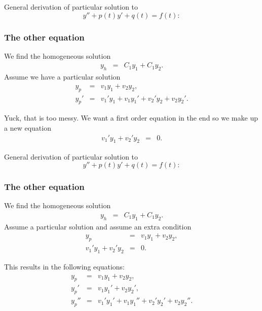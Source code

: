 \begin{frame}
General derivation of particular solution to $$y''+p(t)y'+q(t)=f(t):$$  
  \frametitle{The other equation}

  We find the homogeneous solution 
  \begin{eqnarray*}
    y_h & = & C_1  y_1 + C_1 y_2. 
  \end{eqnarray*}
  Assume we have a particular solution
  \begin{eqnarray*}
    y_p & = & v_1 y_1 + v_2 y_2, \\
    y_p' & = & v_1' y_1 + v_1 y_1' + v_2' y_2 + v_2 y_2'. 
  \end{eqnarray*}

  Yuck, that is too messy. We want a first order equation in the end
  so {\color{red}we make up a new equation
  \begin{eqnarray}
    \label{eqn:firstConstraint}
    v_1' y_1 + v_2' y_2 & = & 0.
  \end{eqnarray}}

\end{frame}


\begin{frame}
General derivation of particular solution to $$y''+p(t)y'+q(t)=f(t):$$  
  \frametitle{The other equation}

  We find the homogeneous solution 
  \begin{eqnarray*}
    y_h & = & C_1  y_1 + C_1 y_2. 
  \end{eqnarray*}
  Assume  a particular solution and assume an extra condition
  \begin{eqnarray*}
    y_p & = & v_1 y_1 + v_2 y_2, \\
    v_1' y_1 + v_2' y_2 & = & 0.
  \end{eqnarray*}


  This results in the following equations:
  \begin{eqnarray*}
    y_p   & = & v_1 y_1 + v_2 y_2, \\
    y_p'  & = & v_1 y_1' + v_2 y_2', \\
    y_p'' & = & v_1' y_1' + v_1 y_1'' + v_2' y_2' + v_2 y_2''. 
  \end{eqnarray*}


\end{frame}




